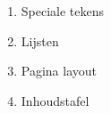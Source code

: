 \documentclass[../presentatie.tex]{subfiles}
\begin{document}
%	
%	

\begin{frame}
	\begin{enumerate}
		\item Speciale tekens
		\item Lijsten
		\item Pagina layout
		\item Inhoudstafel
	\end{enumerate}
\end{frame}
\end{document}

